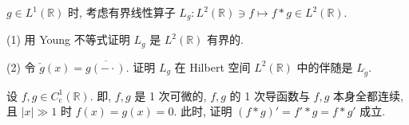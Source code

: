 \begin{exercise}\label{exer:4.4}
$g \in L^{1}(\mathbb{R})$ 时, 考虑有界线性算子 $L_{g}: L^{2}(\mathbb{R}) \ni f \mapsto f * g \in L^{2}(\mathbb{R})$.

(1) 用 Young 不等式证明 $L_{g}$ 是 $L^{2}(\mathbb{R})$ 有界的.

(2) 令 $\check{g}(x) = \overline{g(-\cdot)}$. 证明 $L_{g}$ 在 Hilbert 空间 $L^{2}(\mathbb{R})$ 中的伴随是 $L_{\check{g}}$.
\end{exercise}

\begin{exercise}\label{exer:4.5}
设 $f, g \in C_{\mathrm{c}}^{1}(\mathbb{R})$. 即, $f, g$ 是 1 次可微的, $f, g$ 的 1 次导函数与 $f, g$ 本身全都连续, 且 $|x| \gg 1$ 时 $f(x) = g(x) = 0$. 此时, 证明 $(f * g)' = f' * g = f * g'$ 成立.
\end{exercise}
